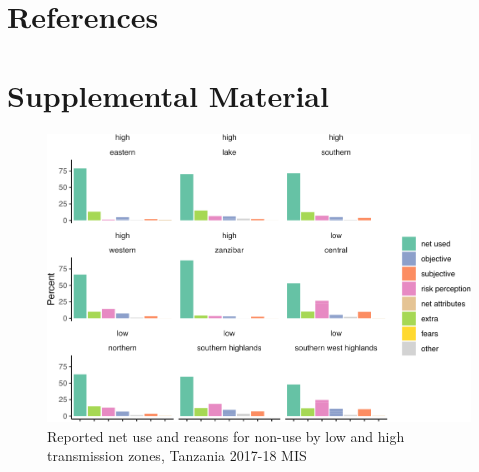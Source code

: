 \documentclass[review,
3p]{elsarticle} %
\newlength{\cslhangindent}
\newlength{\cslentryspacingunit} %
\newenvironment{CSLReferences}[2] %
 {%
  \setlength{\parindent}{0pt}
  \ifodd #1
  \let\oldpar\par
  \def\par{\hangindent=\cslhangindent\oldpar}
  \fi
  \setlength{\parskip}{#2\cslentryspacingunit}
 }%
 {}
\begin{document}
\hypertarget{references}{%
\section{References}\label{references}}

\hypertarget{refs}{}
\begin{CSLReferences}{0}{0}
\end{CSLReferences}

\hypertarget{supplemental-material}{%
\section{Supplemental Material}\label{supplemental-material}}

\begin{figure}

{\centering \includegraphics[width=0.8\linewidth]{reasons_paper_files/figure-latex/tz_facet-1} 

}

\caption{\label{tz_facet}Reported net use and reasons for non-use by low and high transmission zones, Tanzania 2017-18 MIS}\label{fig:tz_facet}
\end{figure}
\end{document}
